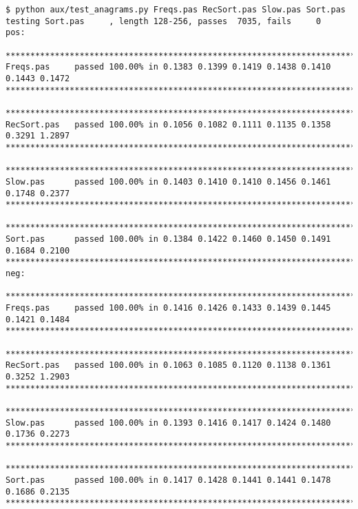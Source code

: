 \documentclass[fleqn,a4paper,11pt]{article}
\begin{document}
\begin{lstlisting}[caption=Actual testing]
$ python aux/test_anagrams.py Freqs.pas RecSort.pas Slow.pas Sort.pas
testing Sort.pas     , length 128-256, passes  7035, fails     0
pos:

********************************************************************************
Freqs.pas     passed 100.00% in 0.1383 0.1399 0.1419 0.1438 0.1410 0.1443 0.1472
********************************************************************************

********************************************************************************
RecSort.pas   passed 100.00% in 0.1056 0.1082 0.1111 0.1135 0.1358 0.3291 1.2897
********************************************************************************

********************************************************************************
Slow.pas      passed 100.00% in 0.1403 0.1410 0.1410 0.1456 0.1461 0.1748 0.2377
********************************************************************************

********************************************************************************
Sort.pas      passed 100.00% in 0.1384 0.1422 0.1460 0.1450 0.1491 0.1684 0.2100
********************************************************************************
neg:

********************************************************************************
Freqs.pas     passed 100.00% in 0.1416 0.1426 0.1433 0.1439 0.1445 0.1421 0.1484
********************************************************************************

********************************************************************************
RecSort.pas   passed 100.00% in 0.1063 0.1085 0.1120 0.1138 0.1361 0.3252 1.2903
********************************************************************************

********************************************************************************
Slow.pas      passed 100.00% in 0.1393 0.1416 0.1417 0.1424 0.1480 0.1736 0.2273
********************************************************************************

********************************************************************************
Sort.pas      passed 100.00% in 0.1417 0.1428 0.1441 0.1441 0.1478 0.1686 0.2135
********************************************************************************
\end{lstlisting}
\iffalse $ \fi %
\end{document}

